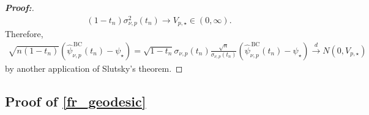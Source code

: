 \documentclass[11pt,twoside]{article}
\theoremstyle{definition}
\theoremstyle{remark}
\begin{document}
\begin{proof}[\textbf{Proof:}]
\begin{align*}
     (1-t_n)\sigma_{\nu,p}^2(t_n) \longrightarrow V_{p,\star}\in(0,\infty).
\end{align*}
Therefore,
\begin{align*}
    \sqrt{n(1-t_n)} \left( \widehat\psi_{\nu,p}^{\,\mathrm{BC}}(t_n)-\psi_\star \right) = \sqrt{1-t_n}\sigma_{\nu,p}(t_n) \frac{\sqrt{n}}{\sigma_{\nu,p}(t_n)} \left( \widehat\psi_{\nu,p}^{\,\mathrm{BC}}(t_n)-\psi_\star \right) \overset{d}{\longrightarrow} N(0,V_{p,\star})
\end{align*}
by another application of Slutsky's theorem.

\end{proof}

\subsection{Proof of \cref{fr_geodesic}} \label{fr_geodesic_proof}
\end{document}
